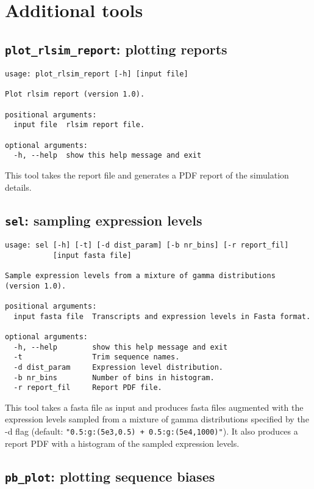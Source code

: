\section{Additional tools}

\subsection{{\tt plot\_rlsim\_report}: plotting \rlsim reports}

\begin{verbatim}
usage: plot_rlsim_report [-h] [input file]

Plot rlsim report (version 1.0).

positional arguments:
  input file  rlsim report file.

optional arguments:
  -h, --help  show this help message and exit
\end{verbatim}

This tool takes the \rlsim report file and generates a PDF report of the simulation details.

\subsection{{\tt sel}: sampling expression levels}


\begin{verbatim}
usage: sel [-h] [-t] [-d dist_param] [-b nr_bins] [-r report_fil]
           [input fasta file]

Sample expression levels from a mixture of gamma distributions (version 1.0).

positional arguments:
  input fasta file  Transcripts and expression levels in Fasta format.

optional arguments:
  -h, --help        show this help message and exit
  -t                Trim sequence names.
  -d dist_param     Expression level distribution.
  -b nr_bins        Number of bins in histogram.
  -r report_fil     Report PDF file.
\end{verbatim}

This tool takes a fasta file as input and produces fasta files augmented with the expression levels sampled from a mixture of gamma distributions
specified by the -d flag (default: \texttt{"0.5:g:(5e3,0.5) + 0.5:g:(5e4,1000)"}). It also produces a report PDF with a histogram of the sampled expression levels.

\subsection{{\tt pb\_plot}: plotting sequence biases}

